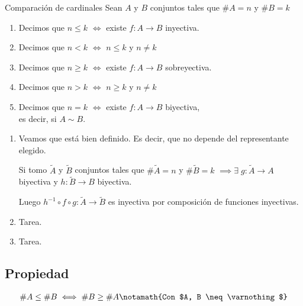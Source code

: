 \medskip

\begin{definicion}{Comparación de cardinales}{}
    Sean $A$ y $B$ conjuntos tales que $\#A=n$ y $\#B=k$

    \begin{enumerate}
        \item Decimos que $n \leq k$ $\iff$ existe $f: A \to B$ inyectiva.
        \item Decimos que $n < k$ $\iff$ $n \leq k$ y $n \neq k$
        \item Decimos que $n \geq k$ $\iff$ existe $f: A \to B$ sobreyectiva.
        \item Decimos que $n>k$ $\iff$ $n \geq k$ y $n \neq k$
        \item Decimos que $n = k$ $\iff$ existe $f: A \to B$ biyectiva,\\
            \phantom{Decimos que $n = k$ $\iff$} %
            es decir, si $A \sim B$.
    \end{enumerate}
\end{definicion}


\begin{enumerate}
    \item Veamos que está bien definido. 
        Es decir, que no depende del representante elegido. 
        
        Si tomo $\widetilde{A}$ y $\widetilde{B}$ conjuntos tales que 
        $\#\widetilde{A} = n$ y $\#\widetilde{B} = k$
        $\implies \exists \; g: \widetilde{A}\to A$ biyectiva y 
        $h:\widetilde{B}\to B$ biyectiva.

        Luego $h^{-1}\circ f \circ g : \widetilde{A} \to \widetilde{B}$ es inyectiva por 
        composición de funciones inyectivas.
    \item Tarea.
    \item Tarea.
\end{enumerate}

\subsection{Propiedad} \label{subsec:prop-card-lqeq}
\begin{gather*}
    \# A \leq \# B \iff \# B \geq \# A \notamath{Con $A, B \neq \varnothing$}
\end{gather*}

